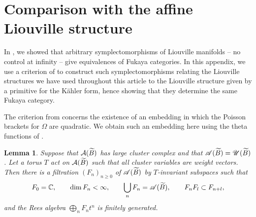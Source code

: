 \documentclass[12pt, letter]{amsart}
\newtheorem{lemma}[dummy]{Lemma}
\theoremstyle{definition}
\begin{document}
\section{Comparison with the affine Liouville structure}\label{app:affine}

In \cite[Theorem 1.1]{HS26}, we showed that arbitrary symplectomorphisms of Liouville manifolds -- no control at infinity -- give equivalences of Fukaya categories.  
In this appendix,
we use a criterion of \cite{HS26} to construct such symplectomorphisms relating the Liouville structures we have used throughout this article to the Liouville structure given by a primitive
for the K\"ahler form, hence showing that they determine the same Fukaya category.





The criterion from \cite{HS26} concerns the existence of an embedding in which the Poisson brackets for $\Omega$ are quadratic.  We obtain such an embedding here using the theta functions of \cite{GHKK}. 



\begin{lemma}\label{lem:theta-filtration}
Suppose that $\mathcal{A}(\widetilde B)$ has large cluster complex \cite[Definition~8.27]{GHKK} and that $\mathscr{A}(\widetilde B)=\mathscr{U}(\widetilde B)$.
Let a torus $T$ act on $\mathcal{A}(\widetilde B)$ such that all cluster variables are weight vectors. Then there is a filtration $(F_n)_{n\ge0}$ of $\mathscr{A}(\widetilde B)$ by $T$-invariant subspaces such that
\[
 F_0=\mathbb{C},\qquad \dim F_n<\infty,\qquad \bigcup_nF_n=\mathscr{A}(\widetilde B),\qquad F_nF_l\subset F_{n+l},
\]
and the Rees algebra $\bigoplus_nF_nt^n$ is finitely generated.
\end{lemma}
\end{document}
